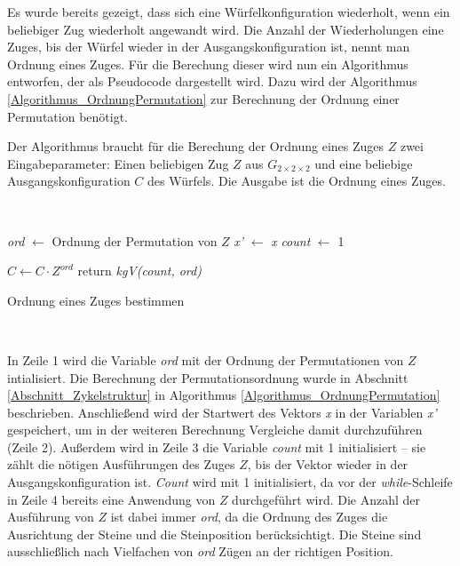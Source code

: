 \documentclass[12pt,a4paper, usenames, dvipsnames]{article}
\theoremstyle{mystyle}
\theoremstyle{definition}
\newcommand{\Gtwo}{\ensuremath{G_{2\times 2\times 2}}}
\begin{document}
Es wurde bereits gezeigt, dass sich eine Würfelkonfiguration wiederholt, wenn ein beliebiger Zug wiederholt angewandt wird. Die Anzahl der Wiederholungen eine Zuges, bis der Würfel wieder in der Ausgangskonfiguration ist, nennt man Ordnung eines Zuges. Für die Berechung dieser wird nun ein Algorithmus entworfen, der als Pseudocode dargestellt wird. Dazu wird der Algorithmus \ref{Algorithmus_OrdnungPermutation} zur Berechnung der Ordnung einer Permutation benötigt.

Der Algorithmus braucht für die Berechung der Ordnung eines Zuges $Z$ zwei Eingabeparameter: Einen beliebigen Zug $Z$ aus $\Gtwo$ und eine beliebige Ausgangskonfiguration $C$ des Würfels. Die Ausgabe ist die Ordnung eines Zuges.


\begin{minipage}[H]{0.15\textwidth}
      $\ $
\end{minipage}
\begin{minipage}[H]{0.65\textwidth}
\begin{algorithm}[H]
\LinesNumbered
\DontPrintSemicolon
{}

 \textit{ord} $\leftarrow$ Ordnung der Permutation von $Z$\;
  \textit{x'} $\leftarrow$ \textit{x}\;
  \textit{count} $\leftarrow$ 1\;

  $C \leftarrow C \cdot  Z^\textit{ord}$ \; 
 return \textit{kgV(count, ord)} \;

\caption{Ordnung eines Zuges bestimmen} 
\label{Algorithmus_OrdnungZug}
\end{algorithm}
\end{minipage}
\begin{minipage}[H]{0.2\textwidth}
      $\ $
\end{minipage}

\vspace*{1em}

In Zeile 1 wird die Variable \textit{ord} mit der Ordnung der Permutationen von $Z$ intialisiert. Die Berechnung der Permutationsordnung wurde in Abschnitt \ref{Abschnitt_Zykelstruktur} in Algorithmus \ref{Algorithmus_OrdnungPermutation} beschrieben. Anschließend wird der Startwert des Vektors \textit{x} in der Variablen \textit{x'} gespeichert, um in der weiteren Berechnung Vergleiche damit durchzuführen (Zeile 2). Außerdem wird in Zeile 3 die Variable \textit{count} mit 1 initialisiert -- sie zählt die nötigen Ausführungen des Zuges $Z$, bis der Vektor wieder in der Ausgangskonfiguration ist. \textit{Count} wird mit 1 initialisiert, da vor der \textit{while}-Schleife in Zeile 4 bereits eine Anwendung von $Z$ durchgeführt wird. Die Anzahl der Ausführung von $Z$ ist dabei immer \textit{ord}, da die Ordnung des Zuges die Ausrichtung der Steine und die Steinposition berücksichtigt. Die Steine sind ausschließlich nach Vielfachen von \textit{ord} Zügen an der richtigen Position.
\end{document}
